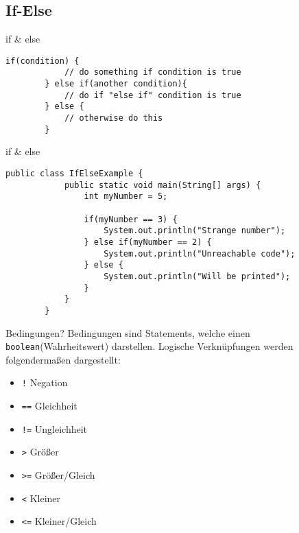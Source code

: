 \subsection{If-Else}
\begin{frame}[fragile]{if \& else}
    \begin{lstlisting}[gobble=8]
        if(condition) {
            // do something if condition is true
        } else if(another condition){
            // do if "else if" condition is true 
        } else {
            // otherwise do this
        }
    \end{lstlisting}
\end{frame}

\begin{frame}[fragile]{if \& else}
    \begin{lstlisting}[gobble=8]
        public class IfElseExample {
            public static void main(String[] args) {
                int myNumber = 5;
                
                if(myNumber == 3) {
                    System.out.println("Strange number");
                } else if(myNumber == 2) {
                    System.out.println("Unreachable code");
                } else {
                    System.out.println("Will be printed");
                }
            }
        }
    \end{lstlisting}
\end{frame}

\begin{frame}{Bedingungen?}
    Bedingungen sind Statements, welche einen \texttt{boolean}(Wahrheitswert) darstellen.
    Logische Verknüpfungen werden folgendermaßen dargestellt:
    \begin{itemize}[<+->]
        \item \texttt{!} Negation
        \item \texttt{==} Gleichheit
        \item \texttt{!=} Ungleichheit
        \item \texttt{>} Größer
        \item \texttt{>=} Größer/Gleich
        \item \texttt{<} Kleiner
        \item \texttt{<=} Kleiner/Gleich
    \end{itemize}
\end{frame}

